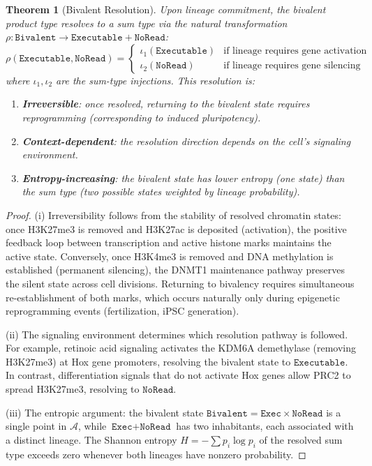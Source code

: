 \documentclass[12pt,a4paper]{article}
\newtheorem{theorem}{Theorem}[section]
\newcommand{\Biv}{\texttt{Bivalent}}
\begin{document}
\begin{theorem}[Bivalent Resolution]
\label{thm:bivalent-resolve}
Upon lineage commitment, the bivalent product type resolves to a sum type via the natural transformation $\rho : \Biv \to \texttt{Executable} + \texttt{NoRead}$:
\[
    \rho(\texttt{Executable}, \texttt{NoRead}) = \begin{cases}
        \iota_1(\texttt{Executable}) & \text{if lineage requires gene activation} \\
        \iota_2(\texttt{NoRead}) & \text{if lineage requires gene silencing}
    \end{cases}
\]
where $\iota_1, \iota_2$ are the sum-type injections. This resolution is:
\begin{enumerate}[label=(\roman*)]
    \item \textbf{Irreversible}: once resolved, returning to the bivalent state requires reprogramming (corresponding to induced pluripotency).
    \item \textbf{Context-dependent}: the resolution direction depends on the cell's signaling environment.
    \item \textbf{Entropy-increasing}: the bivalent state has lower entropy (one state) than the sum type (two possible states weighted by lineage probability).
\end{enumerate}
\end{theorem}

\begin{proof}
(i) Irreversibility follows from the stability of resolved chromatin states: once H3K27me3 is removed and H3K27ac is deposited (activation), the positive feedback loop between transcription and active histone marks maintains the active state. Conversely, once H3K4me3 is removed and DNA methylation is established (permanent silencing), the DNMT1 maintenance pathway preserves the silent state across cell divisions. Returning to bivalency requires simultaneous re-establishment of both marks, which occurs naturally only during epigenetic reprogramming events (fertilization, iPSC generation).

(ii) The signaling environment determines which resolution pathway is followed. For example, retinoic acid signaling activates the KDM6A demethylase (removing H3K27me3) at Hox gene promoters, resolving the bivalent state to $\texttt{Executable}$. In contrast, differentiation signals that do not activate Hox genes allow PRC2 to spread H3K27me3, resolving to $\texttt{NoRead}$.

(iii) The entropic argument: the bivalent state $\Biv = \texttt{Exec} \times \texttt{NoRead}$ is a single point in $\mathcal{A}$, while $\texttt{Exec} + \texttt{NoRead}$ has two inhabitants, each associated with a distinct lineage. The Shannon entropy $H = -\sum p_i \log p_i$ of the resolved sum type exceeds zero whenever both lineages have nonzero probability.
\end{proof}
\end{document}
